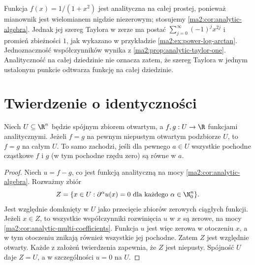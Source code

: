 \begin{przyklad}
\label{ma2:ex:analytic-local-radius}
Funkcja $f(x)=1/(1+x^2)$ jest analityczna
na całej prostej, ponieważ mianownik jest
wielomianem nigdzie niezerowym; stosujemy
\ref{ma2:cor:analytic-algebra}.
Jednak jej szereg Taylora w zerze ma postać
$\sum_{j=0}^\infty(-1)^j x^{2j}$ i promień
zbieżności $1$, jak wykazano w przykładzie
\ref{ma2:ex:power-log-arctan}.
Jednoznaczność współczynników wynika z
\ref{ma2:prop:analytic-taylor-one}.
Analityczność na całej dziedzinie nie oznacza
zatem, że szereg Taylora w jednym ustalonym
punkcie odtwarza funkcję na całej dziedzinie.
\end{przyklad}

\section{Twierdzenie o identyczności}

\begin{twierdzenie}
\label{ma2:thm:analytic-identity}
Niech $U\subseteq\R^n$ będzie spójnym zbiorem
otwartym, a $f,g:U\to\R$ funkcjami analitycznymi.
Jeżeli $f=g$ na pewnym niepustym otwartym
podzbiorze $U$, to $f=g$ na całym $U$.
To samo zachodzi, jeśli dla pewnego $a\in U$
wszystkie pochodne cząstkowe $f$ i $g$
(w tym pochodne rzędu zero) są równe w $a$.
\end{twierdzenie}
\begin{proof}
Niech $u=f-g$, co jest funkcją analityczną
na mocy \ref{ma2:cor:analytic-algebra}.
Rozważmy zbiór
\[
 Z=\{x\in U:\partial^\alpha u(x)=0
                   \text{ dla każdego }\alpha\in\N_0^n\}.
\]
Jest względnie domknięty w $U$ jako
przecięcie zbiorów zerowych ciągłych funkcji.
Jeżeli $x\in Z$, to wszystkie współczynniki
rozwinięcia $u$ w $x$ są zerowe, na mocy
\ref{ma2:cor:analytic-multi-coefficients}.
Funkcja $u$ jest więc zerowa w otoczeniu $x$,
a w tym otoczeniu znikają również wszystkie
jej pochodne. Zatem $Z$ jest względnie otwarty.
Każde z założeń twierdzenia zapewnia,
że $Z$ jest niepusty.
Spójność $U$ daje $Z=U$, a w szczególności
$u=0$ na $U$.
\end{proof}

